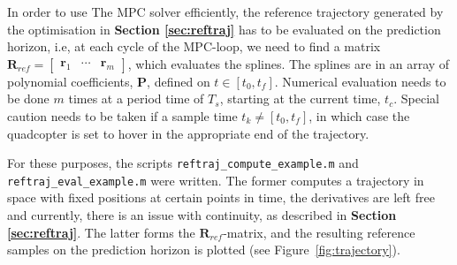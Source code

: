 \documentclass{article}
\begin{document}
In order to use The MPC solver efficiently, the reference trajectory generated by the optimisation in \textbf{Section \ref{sec:reftraj}} has to be evaluated on the prediction horizon, i.e, at each cycle of the MPC-loop, we need to find a matrix $\mathbf{R}_{ref} = \begin{bmatrix}\mathbf{r}_1 & \cdots & \mathbf{r}_m\end{bmatrix}$, which evaluates the splines. The splines are in an array of polynomial coefficients, $\mathbf{P}$, defined on $t\in[t_0,t_f]$. Numerical evaluation needs to be done $m$ times at a period time of $T_s$, starting at the current time, $t_c$. Special caution needs to be taken if a sample time $t_k \neq [t_0,t_f]$, in which case the quadcopter is set to hover in the appropriate end of the trajectory.

For these purposes, the scripts \texttt{reftraj\_compute\_example.m} and \texttt{reftraj\_eval\_example.m} were written. The former computes a trajectory in space with fixed positions at certain points in time, the derivatives are left free and currently, there is an issue with continuity, as described in \textbf{Section \ref{sec:reftraj}}. The latter forms the $\mathbf{R}_{ref}$-matrix, and the resulting reference samples on the prediction horizon is plotted (see Figure~\ref{fig:trajectory}).
\end{document}
